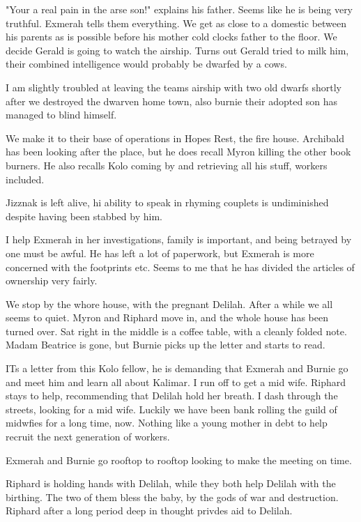 "Your a real pain in the arse son!" explains his father. Seems like he is being very truthful. Exmerah tells them everything. We get as close to a domestic between his parents as is possible before his mother cold clocks father to the floor. We decide Gerald is going to watch the airship. Turns out Gerald tried to milk him, their combined intelligence would probably be dwarfed by a cows.\medskip

I am slightly troubled at leaving the teams airship with two old dwarfs shortly after we destroyed the dwarven home town, also burnie their adopted son has managed to blind himself.\medskip

We make it to their base of operations in Hopes Rest, the fire house. Archibald has been looking after the place, but he does recall Myron killing the other book burners. He also recalls Kolo coming by and retrieving all his stuff, workers included.\medskip

Jizznak is left alive, hi ability to speak in rhyming couplets is undiminished despite having been stabbed by him.\medskip

I help Exmerah in her investigations, family is important, and being betrayed by one must be awful. He has left a lot of paperwork, but Exmerah is more concerned with the footprints etc. Seems to me that he has divided the articles of ownership very fairly.\medskip

We stop by the whore house, with the pregnant Delilah. After a while we all seems to quiet. Myron and Riphard move in, and the whole house has been turned over. Sat right in the middle is a coffee table, with a cleanly folded note. Madam Beatrice is gone, but Burnie picks up the letter and starts to read.\medskip

ITs a letter from this Kolo fellow, he is demanding that Exmerah and Burnie go and meet him and learn all about Kalimar. I run off to get a mid wife. Riphard stays to help, recommending that Delilah hold her breath. I dash through the streets, looking for a mid wife. Luckily we have been bank rolling the guild of midwfies for a long time, now. Nothing like a young mother in debt to help recruit the next generation of workers.\medskip

Exmerah and Burnie go rooftop to rooftop looking to make the meeting on time.\medskip

Riphard is holding hands with Delilah, while they both help Delilah with the birthing. The two of them bless the baby, by the gods of war and destruction. Riphard after a long period deep in thought privdes aid to Delilah.\medskip

